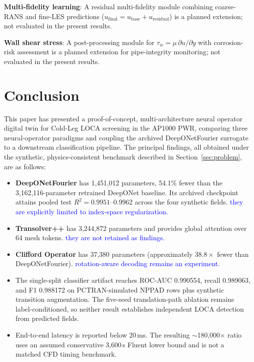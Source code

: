 \documentclass[journal]{IEEEtran}
\newcommand{\added}[1]{\textcolor{blue}{#1}}
\begin{document}
\textbf{Multi-fidelity learning}: A residual multi-fidelity module combining coarse-RANS and fine-LES predictions ($u_\text{final} = u_\text{base} + u_\text{residual}$) is a planned extension; not evaluated in the present results.

\textbf{Wall shear stress}: A post-processing module for $\tau_w = \mu\,\partial u/\partial y$ with corrosion-risk assessment is a planned extension for pipe-integrity monitoring; not evaluated in the present results.

\section{Conclusion}
\label{sec:conclusion}

This paper has presented a proof-of-concept, multi-architecture neural operator digital twin for Cold-Leg LOCA screening in the AP1000 PWR, comparing three neural-operator paradigms and coupling the archived DeepONetFourier surrogate to a downstream classification pipeline. The principal findings, all obtained under the synthetic, physics-consistent benchmark described in Section~\ref{sec:problem}, are as follows:

\begin{itemize}
    \item \textbf{DeepONetFourier} has 1,451,012 parameters, 54.1\% fewer than the 3,162,116-parameter retrained DeepONet baseline. Its archived checkpoint attains pooled test $R^2=0.9951$--0.9962 across the four synthetic fields.  \added{they are explicitly limited to index-space regularization.}
    \item \textbf{Transolver++} has 3,244,872 parameters and provides global attention over 64 mesh tokens.  \added{they are not retained as findings.}
    \item \textbf{Clifford Operator} has 37,380 parameters (approximately $38.8\times$ fewer than DeepONetFourier).  \added{rotation-aware decoding remains an experiment.}
    \item The single-split classifier artifact reaches ROC-AUC 0.990554, recall 0.989063, and F1 0.988172 on PCTRAN-simulated NPPAD rows plus synthetic transition augmentation. The five-seed translation-path ablation remains label-conditioned, so neither result establishes independent LOCA detection from predicted fields.
    \item End-to-end latency is reported below 20\,ms. The resulting $\sim$180,000$\times$ ratio uses an assumed conservative 3,600\,s Fluent lower bound and is not a matched CFD timing benchmark. 
\end{itemize}
\end{document}
